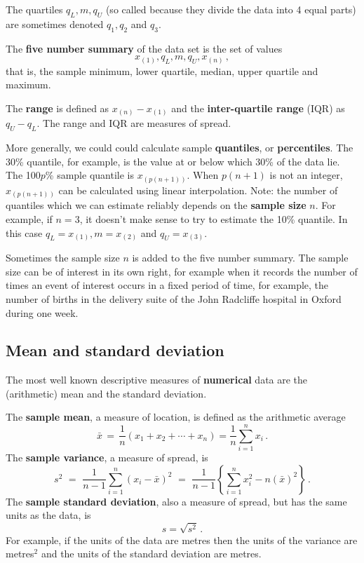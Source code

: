 \documentclass[
  11pt,
  british,
  openany, a4paper]{book}
\begin{document}
The quartiles \(q_L, m, q_U\) (so called because they divide the data into 4 equal parts) are sometimes denoted \(q_1, q_2\) and \(q_3\).

The \textbf{five number summary} of the data set is the set of values
\[x_{(1)},q_L,m,q_U,x_{(n)}\,,\]
that is, the sample minimum, lower quartile, median, upper quartile and maximum.

The \textbf{range} is defined as \(x_{(n)}-x_{(1)}\) and the \textbf{inter-quartile
range} (IQR) as \(q_U-q_L\). The range and IQR are measures of spread.

More generally, we could could calculate sample \textbf{quantiles}, or \textbf{percentiles}. The 30\% quantile, for example, is the value at or below which 30\% of the data lie. The 100\(p\)\% sample quantile is \(x_{(p(n+1))}\). When \(p(n+1)\) is not an integer, \(x_{(p(n+1))}\) can be calculated using linear interpolation. Note: the number of quantiles which we can estimate reliably depends on the \textbf{sample size} \(n\). For example, if \(n=3\), it doesn't make sense to try to estimate the 10\% quantile. In this case \(q_L=x_{(1)}, m=x_{(2)}\) and \(q_U=x_{(3)}\).

Sometimes the sample size \(n\) is added to the five number summary. The
sample size can be of interest in its own right, for example when it records the
number of times an event of interest occurs in a fixed period of time,
for example, the number of births in the delivery suite of the John Radcliffe
hospital in Oxford during one week.

\hypertarget{meanstdev}{%
\subsection{Mean and standard deviation}\label{meanstdev}}

The most well known descriptive measures of \textbf{numerical} data are the (arithmetic) mean and the standard deviation.

The \textbf{sample mean}, a measure of location, is defined as the arithmetic average
\[ \bar{x}\,=\,\frac{1}{n}(x_1+x_2+\cdots+x_n)=\frac{1}{n}\sum_{i=1}^n x_i\,.\]
The \textbf{sample variance}, a measure of spread, is
\[ s^2 \,\,=\,\, \frac{1}{n-1}\sum_{i=1}^n (x_i-\bar{x})^2 \,\,=\,\, \frac{1}{n-1}\left\{\sum_{i=1}^n x_i^2 - n(\bar{x})^2\right\}\,.\]
The \textbf{sample standard deviation}, also a measure of spread, but has the same units as the data, is
\[ s=\sqrt{s^2} \,.\]
For example, if the units of the data are metres then the units of the variance are metres\(^2\) and the units of the standard deviation are metres.
\end{document}
